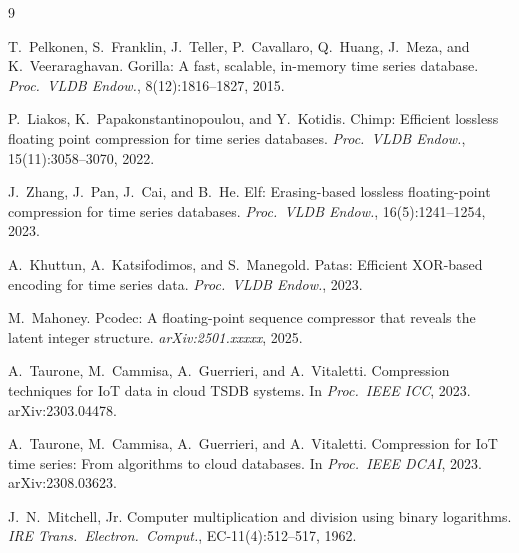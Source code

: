 \documentclass[sigconf]{acmart}
\begin{document}
\begin{thebibliography}{9}

T.~Pelkonen, S.~Franklin, J.~Teller, P.~Cavallaro, Q.~Huang, J.~Meza,
and K.~Veeraraghavan.
\newblock Gorilla: A fast, scalable, in-memory time series database.
\newblock \emph{Proc.\ VLDB Endow.}, 8(12):1816--1827, 2015.

P.~Liakos, K.~Papakonstantinopoulou, and Y.~Kotidis.
\newblock Chimp: Efficient lossless floating point compression for time series
  databases.
\newblock \emph{Proc.\ VLDB Endow.}, 15(11):3058--3070, 2022.

J.~Zhang, J.~Pan, J.~Cai, and B.~He.
\newblock Elf: Erasing-based lossless floating-point compression for time
  series databases.
\newblock \emph{Proc.\ VLDB Endow.}, 16(5):1241--1254, 2023.

A.~Khuttun, A.~Katsifodimos, and S.~Manegold.
\newblock Patas: Efficient XOR-based encoding for time series data.
\newblock \emph{Proc.\ VLDB Endow.}, 2023.

M.~Mahoney.
\newblock Pcodec: A floating-point sequence compressor that reveals the latent
  integer structure.
\newblock \emph{arXiv:2501.xxxxx}, 2025.

A.~Taurone, M.~Cammisa, A.~Guerrieri, and A.~Vitaletti.
\newblock Compression techniques for IoT data in cloud TSDB systems.
\newblock In \emph{Proc.\ IEEE ICC}, 2023. arXiv:2303.04478.

A.~Taurone, M.~Cammisa, A.~Guerrieri, and A.~Vitaletti.
\newblock Compression for IoT time series: From algorithms to cloud databases.
\newblock In \emph{Proc.\ IEEE DCAI}, 2023. arXiv:2308.03623.

J.~N.~Mitchell, Jr.
\newblock Computer multiplication and division using binary logarithms.
\newblock \emph{IRE Trans.\ Electron.\ Comput.}, EC-11(4):512--517, 1962.

\end{thebibliography}
\end{document}
